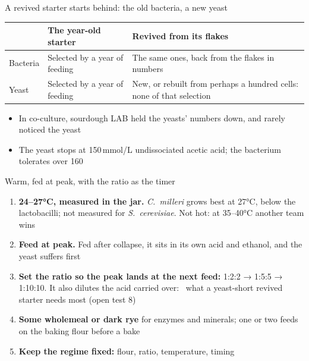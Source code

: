 \documentclass[aspectratio=169,11pt]{beamer}
\begin{document}
\begin{frame}{A revived starter starts behind: the old bacteria, a new yeast}
  \footnotesize
  \begin{tabularx}{\linewidth}{@{}l >{\raggedright\arraybackslash}X >{\raggedright\arraybackslash}X@{}}
    \toprule
    & \textbf{The year-old starter} & \textbf{Revived from its flakes} \\
    \midrule
    Bacteria & Selected by a year of feeding & The same ones, back from the flakes in numbers \\
    Yeast & Selected by a year of feeding & New, or rebuilt from perhaps a hundred cells: none of that selection \\
    \bottomrule
  \end{tabularx}
  \medskip
  \small
  \begin{itemize}
    \item In co-culture, sourdough LAB held the yeasts' numbers down, and rarely noticed the yeast
    \item The yeast stops at 150\,mmol/L undissociated acetic acid; the bacterium tolerates over 160
  \end{itemize}
\end{frame}

\begin{frame}{Warm, fed at peak, with the ratio as the timer}
  \small
  \begin{enumerate}\setlength{\itemsep}{2pt}
    \item \textbf{24--27°C, measured in the jar.} \textit{C.\ milleri} grows best at 27°C, below the lactobacilli; not measured for \textit{S.\ cerevisiae}. Not hot: at 35--40°C another team wins
    \item \textbf{Feed at peak.} Fed after collapse, it sits in its own acid and ethanol, and the yeast suffers first
    \item \textbf{Set the ratio so the peak lands at the next feed:} 1:2:2 → 1:5:5 → 1:10:10. It also dilutes the acid carried over: \hypothesis\ what a yeast-short revived starter needs most (open test 8)
    \item \textbf{Some wholemeal or dark rye} for enzymes and minerals; one or two feeds on the baking flour before a bake
    \item \textbf{Keep the regime fixed:} flour, ratio, temperature, timing
  \end{enumerate}
\end{frame}
\end{document}
